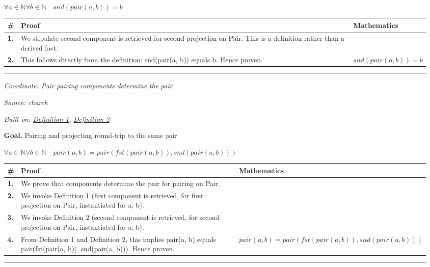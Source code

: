 \documentclass[11pt]{article}
\theoremstyle{definition}
\begin{document}
\noindent$\displaystyle \forall a \in \mathbb{N} \forall b \in \mathbb{N}\quad snd(pair(a, b)) = b$\par
\medskip
\noindent
\begin{tabular}{@{} >{\raggedright\arraybackslash}p{} >{\raggedright\arraybackslash}p{} >{\raggedleft\arraybackslash}p{} @{}}
\textbf{\#} & \textbf{Proof} & \textbf{Mathematics} \\
\midrule
\textbf{1.} & We stipulate second component is retrieved for second projection on Pair. This is a definition rather than a derived fact. & \\[0.45em]
\textbf{2.} & This follows directly from the definition: snd(pair(a, b)) equals b. Hence proven. & $\displaystyle snd(pair(a, b)) = b$ \\[0.45em]
\bottomrule
\end{tabular}
\label{thm:Pair-second projection-second_component_is_retrieved}
\par\medskip\hrule
\bigskip
{}\par
\smallskip\noindent\textit{Coordinate: Pair \cdot pairing \cdot components determine the pair}\par
\smallskip\noindent\textit{Source: church}\par
\smallskip\noindent\textit{Built on: \hyperref[thm:Pair-first projection-first_component_is_retrieved]{Definition 1}, \hyperref[thm:Pair-second projection-second_component_is_retrieved]{Definition 2}}\par
\medskip
\noindent\textbf{Goal.} Pairing and projecting round-trip to the same pair\par
\noindent$\displaystyle \forall a \in \mathbb{N} \forall b \in \mathbb{N}\quad pair(a, b) = pair(fst(pair(a, b)), snd(pair(a, b)))$\par
\medskip
\noindent
\begin{tabular}{@{} >{\raggedright\arraybackslash}p{} >{\raggedright\arraybackslash}p{} >{\raggedleft\arraybackslash}p{} @{}}
\textbf{\#} & \textbf{Proof} & \textbf{Mathematics} \\
\midrule
\textbf{1.} & We prove that components determine the pair for pairing on Pair. & \\[0.45em]
\textbf{2.} & We invoke Definition 1 (first component is retrieved, for first projection on Pair, instantiated for a, b). & \\[0.45em]
\textbf{3.} & We invoke Definition 2 (second component is retrieved, for second projection on Pair, instantiated for a, b). & \\[0.45em]
\textbf{4.} & From Definition 1 and Definition 2, this implies pair(a, b) equals pair(fst(pair(a, b)), snd(pair(a, b))). Hence proven. & $\displaystyle pair(a, b) = pair(fst(pair(a, b)), snd(pair(a, b)))$ \\[0.45em]
\bottomrule
\end{tabular}
\label{thm:Pair-pairing-components_determine_the_pair}
\par\medskip\hrule
\end{document}
